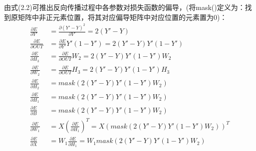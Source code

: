 \documentclass{article}
\begin{document}
由式(2.2)可推出反向传播过程中各参数对损失函数的偏导，(将mask()定义为：找到原矩阵中非正元素位置，将其对应偏导矩阵中对应位置的元素置为0)：
\begin{equation}
	\begin{aligned}
		\frac{\partial{E}}{\partial{Y'}}&=\frac{\partial{(Y'-Y)^2}}{\partial{Y'}}=2(Y'-Y)\\
		\frac{\partial{E}}{\partial{OUT}}&=\frac{\partial{E}}{\partial{Y'}}Y'(1-Y')=2(Y'-Y)Y'(1-Y')\\
		\frac{\partial{E}}{\partial{H_3}}&=	\frac{\partial{E}}{\partial{OUT}}W_2=2(Y'-Y)Y'(1-Y')W_2\\
		\frac{\partial{E}}{\partial{W_2}}&=	\frac{\partial{E}}{\partial{OUT}}H_3=2(Y'-Y)Y'(1-Y')H_3\\
		\frac{\partial{E}}{\partial{H_2}}&=mask(2(Y'-Y)Y'(1-Y')W_2)\\
		\frac{\partial{E}}{\partial{H_1}}&=mask(2(Y'-Y)Y'(1-Y')W_2)\\
		\frac{\partial{E}}{\partial{B}}&=mask(2(Y'-Y)Y'(1-Y')W_2)\\
		\frac{\partial{E}}{\partial{W_1}}&=X(\frac{\partial{E}}{\partial{H_1}})^T=X(mask(2(Y'-Y)Y'(1-Y')W_2))^T\\
		\frac{\partial{E}}{\partial{X}}&=W_1\frac{\partial{E}}{\partial{H_1}}=W_1mask(2(Y'-Y)Y'(1-Y')W_2)
	\end{aligned}
\end{equation}
\end{document}

